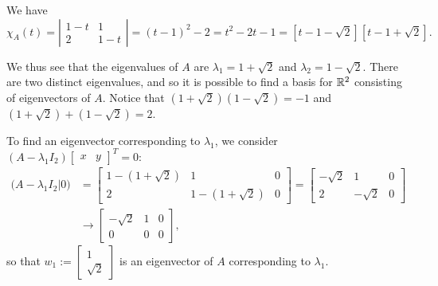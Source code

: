 \documentclass[a4paper]{amsart}
\renewenvironment{solution}{\SolutionInline}{\endSolutionInline}
\begin{document}
\begin{solution}
 \def\Fiba{\textstyle 1+\sqrt{2}}
 \def\Fibb{\textstyle 1-\sqrt{2}}

 We have
 $$
 \chi_A(t) = \left|  \begin{array}{cc}1-t & 1\\2& 1-t
 \end{array} \right| = (t-1)^2 -2 = t^2 - 2t - 1 =
 \left[t - 1-\sqrt{2}\right]\left[t -
 1+\sqrt{2}\right].
 $$

 We thus see that the eigenvalues of $A$ are $\lambda_1 = \Fiba$ and
 $\lambda_2 = \Fibb$. There are two distinct eigenvalues, and so it
 is possible to find a basis for ${\mathbb{R}}^2$ consisting of eigenvectors of
 $A$. Notice that $(\Fiba)(\Fibb) = -1$ and
 $(\Fiba) + (\Fibb) = 2$.

 To find an eigenvector corresponding to $\lambda_1$, we consider
 $(A - \lambda_1I_2)\left[
 \begin{array}{cc}x & y
 \end{array} \right]^T = 0$:
 \begin{align*}
 \big(A - \lambda_1I_2|0\big) &= \left[ \begin{array}{cc|c} 1 -
 (\Fiba) & 1& 0\\ 2 &1 -(\Fiba) & 0\end{array} \right] = \left[
 \begin{array}{cc|c} -\sqrt{2} & 1 & 0\\ 2 & -\sqrt{2} & 0
 \end{array} \right]\\ & \to \left[ \begin{array}{cc|c}
 -\sqrt{2} & 1 & 0\\0 & 0 & 0
 \end{array} \right],
 \end{align*}
 so that $w_1 := \left[ \begin{array}{c}1\\ \sqrt{2}
 \end{array} \right]$ is an eigenvector of $A$ corresponding to
 $\lambda_1$.


\end{solution}
\end{document}
